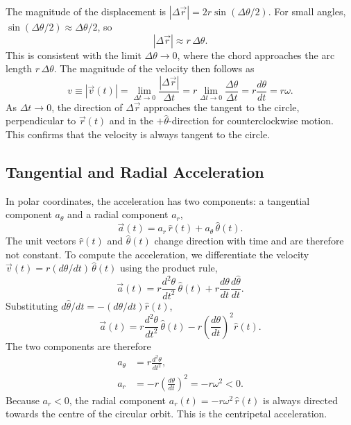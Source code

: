 The magnitude of the displacement is $|\Delta\vec{r}| = 2r\sin(\Delta\theta/2)$. For small angles, $\sin(\Delta\theta/2) \approx \Delta\theta/2$, so
\begin{equation}
    |\Delta\vec{r}| \approx r\,\Delta\theta.
\end{equation}
This is consistent with the limit $\Delta\theta \to 0$, where the chord approaches the arc length $r\,\Delta\theta$. The magnitude of the velocity then follows as
\begin{equation}
    v \equiv |\vec{v}(t)| = \lim_{\Delta t\to 0}\frac{|\Delta\vec{r}|}{\Delta t} = r\lim_{\Delta t\to 0}\frac{\Delta\theta}{\Delta t} = r\frac{d\theta}{dt} = r\omega.
\end{equation}
As $\Delta t\to 0$, the direction of $\Delta\vec{r}$ approaches the tangent to the circle, perpendicular to $\vec{r}(t)$ and in the $+\hat{\theta}$-direction for counterclockwise motion. This confirms that the velocity is always tangent to the circle.

\subsection{Tangential and Radial Acceleration}

In polar coordinates, the acceleration has two components: a tangential component $a_\theta$ and a radial component $a_r$,
\begin{equation}
    \vec{a}(t) = a_r\,\hat{r}(t) + a_\theta\,\hat{\theta}(t).
\end{equation}
The unit vectors $\hat{r}(t)$ and $\hat{\theta}(t)$ change direction with time and are therefore not constant. To compute the acceleration, we differentiate the velocity $\vec{v}(t) = r(d\theta/dt)\,\hat{\theta}(t)$ using the product rule,
\begin{equation}
    \vec{a}(t) = r\frac{d^2\theta}{dt^2}\,\hat{\theta}(t) + r\frac{d\theta}{dt}\frac{d\hat{\theta}}{dt}.
\end{equation}
Substituting $d\hat{\theta}/dt = -(d\theta/dt)\hat{r}(t)$,
\begin{equation}
    \vec{a}(t) = r\frac{d^2\theta}{dt^2}\,\hat{\theta}(t) - r\left(\frac{d\theta}{dt}\right)^2\hat{r}(t).
\end{equation}
The two components are therefore
\begin{align}
    a_\theta &= r\frac{d^2\theta}{dt^2}, \label{eq:atangential}\\
    a_r      &= -r\left(\frac{d\theta}{dt}\right)^2 = -r\omega^2 < 0. \label{eq:aradial}
\end{align}
Because $a_r < 0$, the radial component $a_r(t) = -r\omega^2\,\hat{r}(t)$ is always directed towards the centre of the circular orbit. This is the centripetal acceleration.

